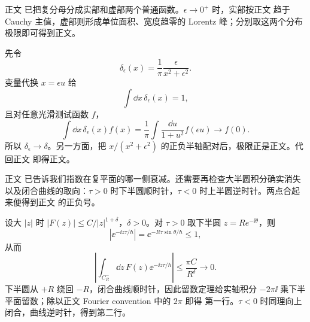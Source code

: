 

\begin{derivation}

正文 已把复分母分成实部和虚部两个普通函数。$\epsilon\to0^+$ 时，实部按正文 趋于 Cauchy 主值，虚部则形成单位面积、宽度趋零的 Lorentz 峰；分别取这两个分布极限即可得到正文。

先令
\begin{equation*}
 \delta_\epsilon(x)
 =\frac1\pi\frac{\epsilon}{x^2+\epsilon^2}.
\end{equation*}
变量代换 $x=\epsilon u$ 给
\begin{equation*}
 \int\dd x\,\delta_\epsilon(x)=1,
\end{equation*}
且对任意光滑测试函数 $f$，
\begin{equation*}
 \int\dd x\,\delta_\epsilon(x)f(x)
 =\frac1\pi\int\frac{\dd u}{1+u^2}f(\epsilon u)
 \longrightarrow f(0).
\end{equation*}
所以 $\delta_\epsilon\to\delta$。另一方面，把
$x/(x^2+\epsilon^2)$ 的正负半轴配对后，极限正是正文。代回正文 即得正文。
\end{derivation}

\begin{derivation}

正文 已告诉我们指数在复平面的哪一侧衰减。还需要再检查大半圆积分确实消失以及闭合曲线的取向：$\tau>0$ 时下半圆顺时针，$\tau<0$ 时上半圆逆时针。两点合起来便得到正文 的正负号。

设大 $|z|$ 时 $|F(z)|\le C/|z|^{1+\delta}$，$\delta>0$。对 $\tau>0$ 取下半圆 $z=Re^{-\ii\theta}$，则
\begin{equation*}
 |\ee^{-\ii z\tau/\hbar}|=\ee^{-R\tau\sin\theta/\hbar}\le1,
\end{equation*}
从而
\begin{equation*}
 \left|\int_{C_R^-}\dd z\,F(z)\ee^{-\ii z\tau/\hbar}\right|
 \le\frac{\pi C}{R^\delta}\to0.
\end{equation*}
下半圆从 $+R$ 绕回 $-R$，闭合曲线顺时针，因此留数定理给实轴积分
$-2\pi\ii$ 乘下半平面留数；除以正文 Fourier convention 中的 $2\pi$ 即得 第一行。$\tau<0$ 时同理向上闭合，曲线逆时针，得到第二行。
\end{derivation}

